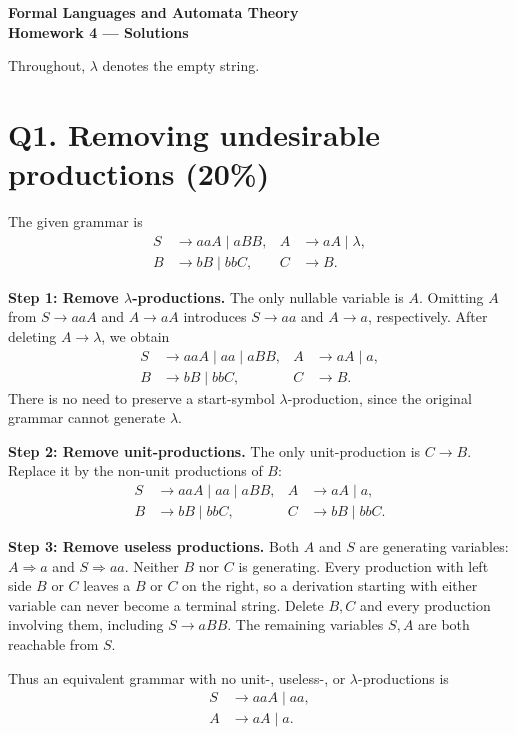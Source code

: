 \documentclass[11pt,a4paper]{article}
\newcommand{\derive}{\Rightarrow}
\begin{document}
\begin{center}
  {\Large\bfseries Formal Languages and Automata Theory}\\[3pt]
  {\large\bfseries Homework 4 --- Solutions}
\end{center}
Throughout, $\lambda$ denotes the empty string.

\section*{Q1. Removing undesirable productions (20\%)}
The given grammar is
\[
\begin{aligned}
S&\to aaA\mid aBB, & A&\to aA\mid\lambda,\\
B&\to bB\mid bbC, & C&\to B.
\end{aligned}
\]

\textbf{Step 1: Remove $\lambda$-productions.}
The only nullable variable is $A$. Omitting $A$ from $S\to aaA$ and
$A\to aA$ introduces $S\to aa$ and $A\to a$, respectively.
After deleting $A\to\lambda$, we obtain
\[
\begin{aligned}
S&\to aaA\mid aa\mid aBB, & A&\to aA\mid a,\\
B&\to bB\mid bbC, & C&\to B.
\end{aligned}
\]
There is no need to preserve a start-symbol $\lambda$-production, since
the original grammar cannot generate $\lambda$.

\textbf{Step 2: Remove unit-productions.}
The only unit-production is $C\to B$. Replace it by the non-unit
productions of $B$:
\[
\begin{aligned}
S&\to aaA\mid aa\mid aBB, & A&\to aA\mid a,\\
B&\to bB\mid bbC, & C&\to bB\mid bbC.
\end{aligned}
\]

\textbf{Step 3: Remove useless productions.}
Both $A$ and $S$ are generating variables: $A\derive a$ and $S\derive aa$.
Neither $B$ nor $C$ is generating. Every production with left side $B$
or $C$ leaves a $B$ or $C$ on the right, so a derivation starting with
either variable can never become a terminal string.
Delete $B,C$ and every production involving them, including $S\to aBB$.
The remaining variables $S,A$ are both reachable from $S$.

Thus an equivalent grammar with no unit-, useless-, or
$\lambda$-productions is
\[
\boxed{\begin{aligned}
S&\to aaA\mid aa,\\
A&\to aA\mid a.
\end{aligned}}
\]
\end{document}
